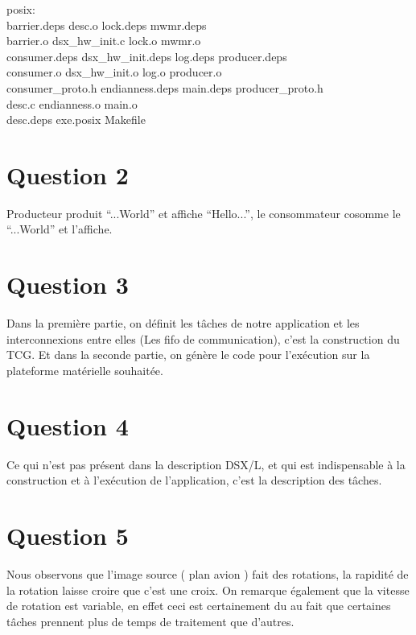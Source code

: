 \documentclass[12pt]{article}
\begin{document}
posix:\\
barrier.deps      desc.o            lock.deps  mwmr.deps\\
barrier.o         dsx\_hw\_init.c     lock.o     mwmr.o\\
consumer.deps     dsx\_hw\_init.deps  log.deps   producer.deps\\
consumer.o        dsx\_hw\_init.o     log.o      producer.o\\
consumer\_proto.h  endianness.deps   main.deps  producer\_proto.h\\
desc.c            endianness.o      main.o\\
desc.deps         exe.posix         Makefile\\

\section*{Question 2}
Producteur produit ``...World'' et affiche ``Hello...'', le consommateur cosomme le ``...World'' et l'affiche.

\section*{Question 3}
Dans la première partie, on définit les tâches de notre application et les interconnexions entre elles (Les fifo de communication), c'est la construction du TCG. Et dans la seconde partie, on génère le code pour l'exécution sur la plateforme matérielle souhaitée.

\section*{Question 4}
Ce qui n'est pas présent dans la description DSX/L, et qui est indispensable 
à la construction et à l'exécution de l'application, c'est la description
des tâches.

\section*{Question 5}
Nous observons que l'image source ( plan avion ) fait des rotations, la 
rapidité de la rotation laisse croire que c'est une croix.
On remarque également que la vitesse de rotation est variable, en effet ceci 
est certainement du au fait que certaines tâches prennent plus de temps de 
traitement que d'autres.
\end{document}
